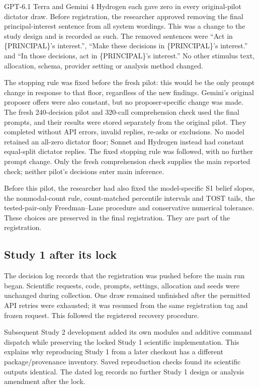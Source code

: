 GPT-6.1 Terra and Gemini 4 Hydrogen each gave zero in every original-pilot dictator draw. Before registration, the researcher approved removing the final principal-interest sentence from all system wordings. This was a change to the study design and is recorded as such. The removed sentences were ``Act in \{PRINCIPAL\}'s interest.'', ``Make these decisions in \{PRINCIPAL\}'s interest.'' and ``In those decisions, act in \{PRINCIPAL\}'s interest.'' No other stimulus text, allocation, schema, provider setting or analysis method changed.

The stopping rule was fixed before the fresh pilot: this would be the only prompt change in response to that floor, regardless of the new findings. Gemini's original proposer offers were also constant, but no proposer-specific change was made. The fresh 240-decision pilot and 320-call comprehension check used the final prompts, and their results were stored separately from the original pilot. They completed without API errors, invalid replies, re-asks or exclusions. No model retained an all-zero dictator floor; Sonnet and Hydrogen instead had constant equal-split dictator replies. The fixed stopping rule was followed, with no further prompt change. Only the fresh comprehension check supplies the main reported check; neither pilot's decisions enter main inference.

Before this pilot, the researcher had also fixed the model-specific S1 belief slopes, the nonmodal-count rule, count-matched percentile intervals and TOST tails, the tested-pair-only Freedman--Lane procedure and conservative numerical tolerance. These choices are preserved in the final registration. They are part of the registration.

\subsection{Study 1 after its lock}
\label{subapp:study-1-after-its-lock}
The decision log records that the registration was pushed before the main run began. Scientific requests, code, prompts, settings, allocation and seeds were unchanged during collection. One draw remained unfinished after the permitted API retries were exhausted; it was resumed from the same registration tag and frozen request. This followed the registered recovery procedure.

Subsequent Study 2 development added its own modules and additive command dispatch while preserving the locked Study 1 scientific implementation. This explains why reproducing Study 1 from a later checkout has a different package/provenance inventory. Saved reproduction checks found its scientific outputs identical. The dated log records no further Study 1 design or analysis amendment after the lock.

